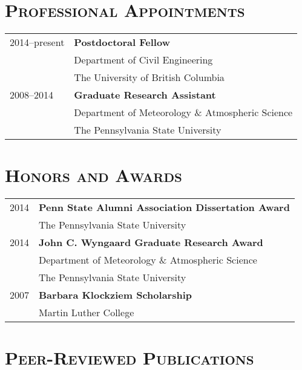 \documentclass[11pt,letterpaper]{article}
\begin{document}
\section*{\textsc{Professional Appointments}} 

\begin{tabular}{l l}
2014--present & \textbf{Postdoctoral Fellow} \\ & Department of Civil Engineering \\
              & The University of British Columbia \\[1.5\parskip]
2008--2014 & \textbf{Graduate Research Assistant} \\ & Department of Meteorology \& Atmospheric Science\\
                 & The Pennsylvania State University
\end{tabular}

\section*{\textsc{Honors and Awards}} 
\begin{tabular}{l l}
2014 & \textbf{Penn State Alumni Association Dissertation Award} \\
     & The Pennsylvania State University \\[1.5\parskip]

2014 & \textbf{John C. Wyngaard Graduate Research Award} \\
     & Department of Meteorology \& Atmospheric Science \\ & The Pennsylvania State University \\[1.5\parskip]


2007 & \textbf{Barbara Klockziem Scholarship} \\
     & Martin Luther College

\end{tabular}

\section*{\textsc{Peer-Reviewed Publications}} 
\end{document}
